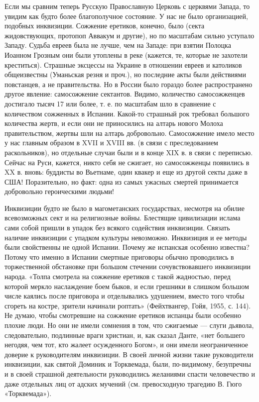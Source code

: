 Если мы сравним теперь Русскую Православную Церковь с церквями Запада, то
увидим как будто более благополучное состояние. У нас не было организацией,
подобных инквизиции. Сожжение еретиков, конечно, было (секта жидовствующих,
протопоп Аввакум и другие), но по масштабам сильно уступало Западу. Судьба
евреев была не лучше, чем на Западе: при взятии Полоцка Иоанном Грозным они
были утоплены в реке (кажется, те, которые не захотели креститься). Страшные
эксцессы на Украине в отношении евреев и католиков общеизвестны (Уманьская
резня и проч.), но последние акты были действиями повстанцев, а не
правительства. Но в России было гораздо более распространено другое явление:
самосожжение сектантов. Видимо, количество самосожженцев достигало тысяч 17 или
более, т. е. по масштабам шло в сравнение с количеством сожженных в Испании.
Какой-то страшный рок требовал большого количества жертв, и если они не
приносились на алтарь нового Молоха правительством, жертвы шли на алтарь
добровольно. Самосожжение имело место у нас главным образом в XVII и XVIII вв.
(в связи с преследованием раскольников), но отдельные случаи были и в конце XIX
в. в связи с переписью. Сейчас на Руси, кажется, никто себя не сжигает, но
самосожженцы появились в XX в. вновь: буддисты во Вьетнаме, один квакер и еще
из другой секты даже в США! Поразительно, но факт: одна из самых ужасных
смертей принимается добровольно героическими людьми!

Инквизиции будто не было в магометанских государствах, несмотря на
обилие всевозможных сект и на религиозные войны. Блестящие цивилизации
ислама сами собой пришли в упадок без всякого содействия инквизиции.
Связать наличие инквизиции с упадком культуры невозможно. Инквизиция и
ее методы были свойственны не одной Испании. Почему же испанская
особенно известна? Потому что именно в Испании смертные приговоры
обычно проводились в торжественной
обстановке при большом стечении сочувствовавшего инквизиции народа. «Толпа
смотрела на сожжение еретиков с такой жадностью, перед которой меркло
наслаждение боем быков, и если грешники в слишком большом числе каялись после
приговора и отделывались удушением, вместо того чтобы сгореть на костре,
зрители начинали роптать» (Фейхтвангер, Гойя, 1955, с. 144). Не думаю, чтобы
смотревшие на сожжение еретиков испанцы были особенно плохие люди. Но они не
имели сомнения в том, что сжигаемые --- слуги дьявола, следовательно, подлинные
враги христиан, и, как сказал Данте, «нет большего негодяя, чем тот, кто жалеет
осужденного Богом», и они имели неограниченное доверие к руководителям
инквизиции. В своей личной жизни такие руководители инквизиции, как святой
Доминик и Торквемада, были, по-видимому, безупречны и в своей страшной
деятельности руководились желаниями спасти человечество и даже отдельных лиц от
адских мучений (см. превосходную трагедию В. Гюго «Торквемада»).

